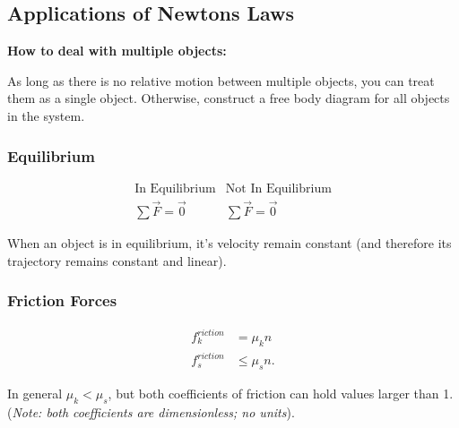 \documentclass{standalone}
\begin{document}
\subsection{Applications of Newtons Laws}\label{newtonsapplications}

\textbf{How to deal with multiple objects:} 

\noindent
As long as there is no relative motion between multiple objects, you can treat them as a single object. Otherwise, construct a free body diagram for all objects in the system.

\subsubsection{Equilibrium}\label{equilibrium}

\begin{align*}
			&	\text{In Equilibrium} & \text{Not In Equilibrium} & \\
			&	\sum \vec{F} = \vec{0} & \sum \vec{F} = \vec{0} &
\end{align*}

When an object is in equilibrium, it's velocity remain constant (and therefore its trajectory remains constant and linear).

\subsubsection{Friction Forces}\label{friction}

\begin{align*}
				f^{riction}_k &= \mu_k n \\
				f^{riction}_s &\le \mu_s n 
.\end{align*}

In general $\mu_k < \mu_s$, but both coefficients of friction can hold values larger than 1. (\textit{Note: both coefficients are dimensionless; no units}). 
\end{document}
